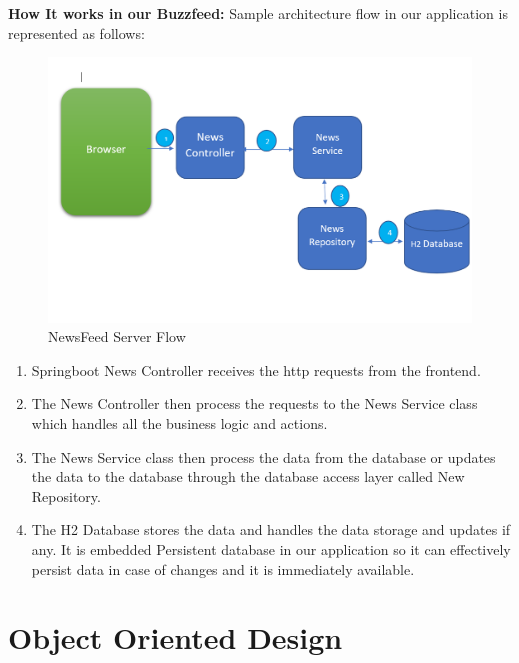   \textbf{\large How It works in our Buzzfeed:}
  Sample architecture flow in our application is represented as follows:
   \begin{figure}[h!]
     \begin{center}
          \includegraphics[scale=0.7]{images/example.PNG}
             \centering \caption{NewsFeed Server Flow}
    \end{center}
    \end{figure}
\begin{enumerate}
    \item Springboot News Controller receives the http requests from the frontend.
    \item The News Controller then process the requests to the News Service class which handles all the business logic and actions.
    \item The News Service class then process the data from the database or updates the data to the database through the database access layer called New Repository.
    \item The H2 Database stores the data and handles the data storage and updates if any. It is embedded Persistent database in our application so it can effectively persist data in case of changes and it is immediately available.
\end{enumerate}
 
 \section{Object Oriented Design}
 
      
